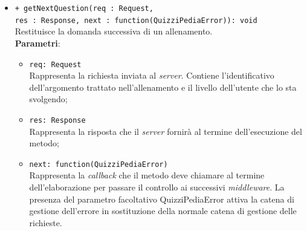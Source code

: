 \begin{itemize}
\begin{itemize}
\begin{itemize}
			\end{itemize}
			\item \texttt{+ getNextQuestion(req : Request, \\res : Response, next : function(QuizziPediaError)): void} \\
			Restituisce la domanda successiva di un allenamento.  \\
			\textbf{Parametri}:
			\begin{itemize}
			\item \texttt{req: Request} \\
			Rappresenta la richiesta inviata al \textit{server}. Contiene l'identificativo dell'argomento trattato nell'allenamento e il livello dell'utente che lo sta svolgendo;
			\item \texttt{res: Response} \\
			Rappresenta la risposta che il \textit{server} fornirà al termine dell'esecuzione del metodo;
			\item \texttt{next: function(QuizziPediaError)} \\
			Rappresenta la \textit{callback} che il metodo deve chiamare al termine dell'elaborazione per passare il controllo ai successivi \textit{middleware}. La presenza del parametro facoltativo QuizziPediaError attiva la catena di gestione dell'errore in sostituzione della normale catena di gestione delle richieste.
			\end{itemize}
		\end{itemize}
\end{itemize}